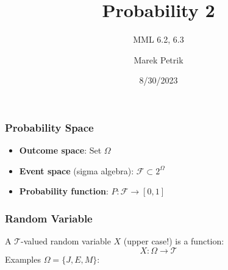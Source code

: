 \documentclass{beamer}
\title{Probability 2}
\subtitle{MML 6.2, 6.3}
\author{Marek Petrik}
\date{8/30/2023}
\begin{document}
\begin{frame}
\maketitle
\end{frame}

\begin{frame} \frametitle{Probability Space}
\begin{itemize}
\item \textbf{Outcome space}: Set $\Omega$
  \vfill 
\item \textbf{Event space} (sigma algebra): $\mathcal{F} \subset 2^{\Omega}$
  \vfill
\item \textbf{Probability function}: $P \colon \mathcal{F} \to [0,1]$
\end{itemize}
\end{frame}

\begin{frame} \frametitle{Random Variable}
  A $\mathcal{T}$-valued random variable $X$ (upper case!) is a function:
  \[ X \colon \Omega \to \mathcal{T}\]
    Examples \( \Omega = \{ J, E, M \} \):
    \vspace{4cm}
\end{frame}
\end{document}
